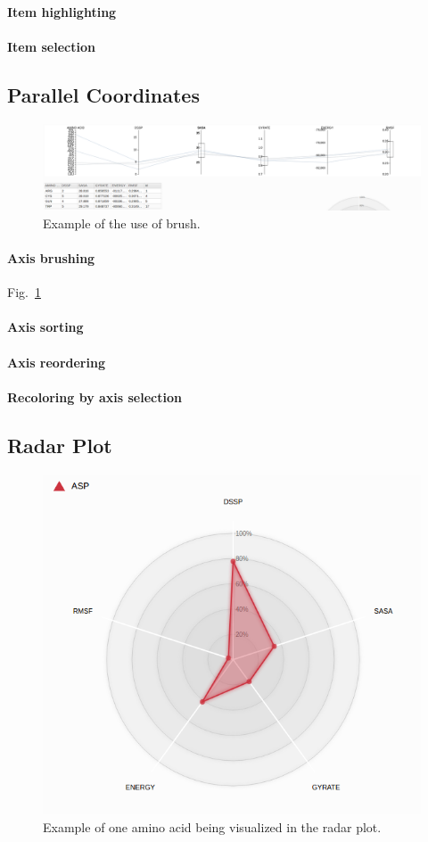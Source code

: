 \documentclass[10pt, conference]{IEEEtran}
\begin{document}
\paragraph*{Item highlighting}
\paragraph*{Item selection}

\subsection{Parallel Coordinates}
\begin{figure}
\includegraphics[width=0.8\linewidth]{figs/brush.png}
\caption{Example of the use of brush.} 
\label{fig:brush}
\end{figure}
\paragraph*{Axis brushing} Fig.~\ref{fig:brush}

\paragraph*{Axis sorting}
\paragraph*{Axis reordering}
\paragraph*{Recoloring by axis selection}

\subsection{Radar Plot}
\begin{figure}
\includegraphics[width=0.8\linewidth]{figs/radar.png}
\caption{Example of one amino acid being visualized in the radar plot.} 
\label{fig:radar}
\end{figure}
\end{document}
